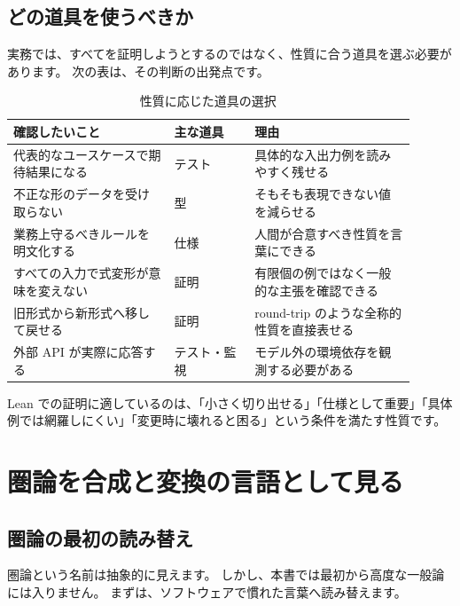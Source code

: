 \subsection{どの道具を使うべきか}

実務では、すべてを証明しようとするのではなく、性質に合う道具を選ぶ必要があります。
次の表は、その判断の出発点です。

\begin{table}[htbp]
\centering
\caption{性質に応じた道具の選択}
\label{tab:ch00-tool-choice}
\begin{tabular}{p{0.36\linewidth}p{0.18\linewidth}p{0.36\linewidth}}
\toprule
確認したいこと & 主な道具 & 理由 \\
\midrule
代表的なユースケースで期待結果になる & テスト & 具体的な入出力例を読みやすく残せる \\
不正な形のデータを受け取らない & 型 & そもそも表現できない値を減らせる \\
業務上守るべきルールを明文化する & 仕様 & 人間が合意すべき性質を言葉にできる \\
すべての入力で式変形が意味を変えない & 証明 & 有限個の例ではなく一般的な主張を確認できる \\
旧形式から新形式へ移して戻せる & 証明 & round-trip のような全称的性質を直接表せる \\
外部 API が実際に応答する & テスト・監視 & モデル外の環境依存を観測する必要がある \\
\bottomrule
\end{tabular}
\end{table}

Lean での証明に適しているのは、「小さく切り出せる」「仕様として重要」「具体例では網羅しにくい」「変更時に壊れると困る」という条件を満たす性質です。

\section{圏論を合成と変換の言語として見る}
\label{sec:ch00-category-language}

\subsection{圏論の最初の読み替え}

圏論という名前は抽象的に見えます。
しかし、本書では最初から高度な一般論には入りません。
まずは、ソフトウェアで慣れた言葉へ読み替えます。

